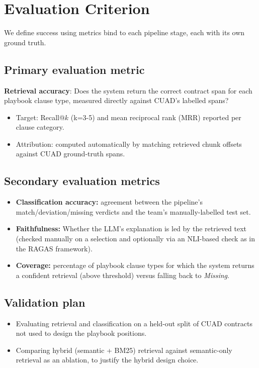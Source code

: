 \documentclass[11pt]{article}
\newcommand{\secx}[1]{\section{#1}}
\newcommand{\subsecx}[1]{\subsection{#1}}
\begin{document}
\secx{Evaluation Criterion}
We define success using metrics bind to each pipeline stage, each with its own
ground truth.

\subsecx{Primary evaluation metric}
\textbf{Retrieval accuracy}: Does the system return the correct contract span for each
playbook clause type, measured directly against CUAD's labelled spans?
\begin{itemize}
  \item Target: Recall@$k$ (k=3-5) and mean reciprocal rank (MRR) reported per
  clause category.
  \item Attribution: computed automatically by matching retrieved chunk offsets
  against CUAD ground-truth spans.
\end{itemize}

\subsecx{Secondary evaluation metrics}
\begin{itemize}
  \item \textbf{Classification accuracy:} agreement between the pipeline's
  match/deviation/missing verdicts and the team's manually-labelled test set.
  \item \textbf{Faithfulness:} Whether the LLM's explanation is led by the
  retrieved text (checked manually on a selection and optionally via an
  NLI-based check as in the RAGAS framework).
  \item \textbf{Coverage:} percentage of playbook clause types for which the system
  returns a confident retrieval (above threshold) versus falling back to
  \emph{Missing}.
\end{itemize}

\subsecx{Validation plan}
\begin{itemize}
  \item Evaluating retrieval and classification on a held-out split of CUAD contracts
  not used to design the playbook positions.
  \item Comparing hybrid (semantic + BM25) retrieval against semantic-only retrieval
  as an ablation, to justify the hybrid design choice.
\end{itemize}
\end{document}
